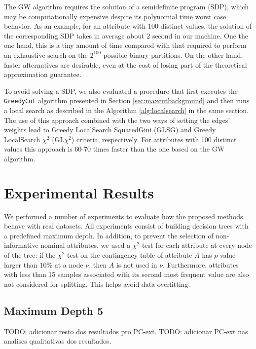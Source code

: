 The GW algorithm  requires  the solution of a semidefinite program (SDP),
which may be computationally expensive despite  its 
polynomial time worst case  behavior.
As an example, for an attribute with 100 distinct values, the solution of
the corresponding SDP takes in average about 2 second in our machine.
One the one hand, this is a tiny amount of time 
compared with that required to perform an exhaustive search on the $2^{100}$
possible binary partitions. On the other hand, 
 faster alternatives are desirable, even
at the cost of losing part of the theoretical approximation guarantee. 

To avoid solving a SDP, 
we also evaluated a procedure
that first executes the {\tt GreedyCut} algorithm presented
in Section \ref{sec:maxcutbackground} and then runs a local search as described
in the Algorithm  \ref{alg:localsearch} in the same section. 
The use of this approach combined with the two
ways of setting the edges' weights lead to
 Greedy LocalSearch SquaredGini (GLSG) and 
Greedy LocalSearch $\chi^2$ (GL$\chi^2$) 
criteria, respectively.
For attributes with 100 distinct values this approach is 60-70
times faster than the one based on the GW algorithm.


\section{Experimental Results}

We performed a number of experiments to evaluate how the
proposed methods behave with real datasets.
All experiments consist of building decision trees
with a predefined maximum depth.  In addition,
to prevent the selection of non-informative nominal attributes, 
we used a $\chi^2$-test for each attribute at every node of
the tree: if the $\chi^2$-test  on the contingency table of attribute $A$
has $p$-value larger than $10\%$ at a node $\nu$, then
$A$ is not used in $\nu$. Furthermore, attributes with less than 15 samples associated with its
second most frequent value are also not considered for splitting. This helps  avoid data overfitting.


\subsection{Maximum Depth 5}

TODO: adicionar resto dos resultados pro PC-ext.
TODO: adicionar PC-ext nas analises qualitativas dos resultados.

